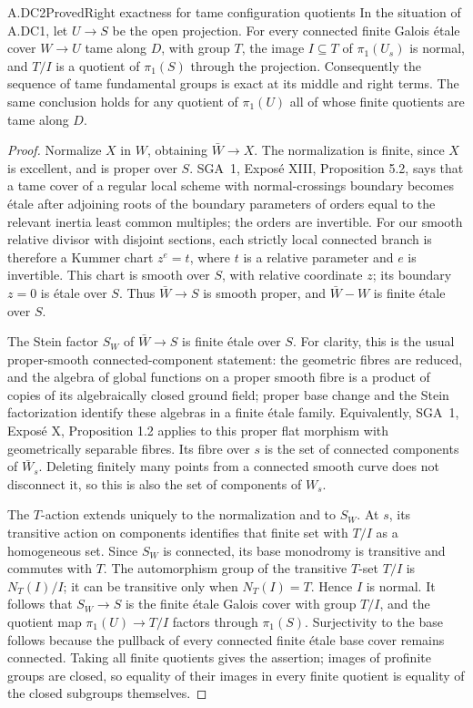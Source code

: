 \begin{claim}{A.DC2}{Proved}{Right exactness for tame configuration quotients}
In the situation of A.DC1, let $U\to S$ be the open projection.
For every connected finite Galois \'etale cover $W\to U$ tame along
$D$, with group $T$, the image $I\subseteq T$ of $\pi_1(U_s)$ is
normal, and $T/I$ is a quotient of $\pi_1(S)$ through the projection.
Consequently the sequence of tame fundamental groups is exact at its
middle and right terms. The same conclusion holds for any quotient of
$\pi_1(U)$ all of whose finite quotients are tame along $D$.
\end{claim}

\begin{proof}
Normalize $X$ in $W$, obtaining $\bar W\to X$. The normalization is
finite, since $X$ is excellent, and is proper over $S$.
SGA~1, Expos\'e XIII, Proposition 5.2, says that a tame cover of a
regular local scheme with normal-crossings boundary becomes \'etale
after adjoining roots of the boundary parameters of orders equal to
the relevant inertia least common multiples; the orders are invertible.
For our smooth relative divisor with disjoint sections, each strictly
local connected branch is therefore a Kummer chart $z^e=t$, where
$t$ is a relative parameter and $e$ is invertible. This chart is smooth
over $S$, with relative coordinate $z$; its boundary $z=0$ is \'etale
over $S$. Thus $\bar W\to S$ is smooth proper, and
$\bar W-W$ is finite \'etale over $S$.

The Stein factor $S_W$ of $\bar W\to S$ is finite \'etale over $S$.
For clarity, this is the usual proper-smooth connected-component
statement: the geometric fibres are reduced, and the algebra of
global functions on a proper smooth fibre is a product of copies of
its algebraically closed ground field; proper base change and the
Stein factorization identify these algebras in a finite \'etale family.
Equivalently, SGA~1, Expos\'e X, Proposition 1.2 applies to this proper
flat morphism with geometrically separable fibres.
Its fibre over $s$ is the set of connected components of $\bar W_s$.
Deleting finitely many points from a connected smooth curve does not
disconnect it, so this is also the set of components of $W_s$.

The $T$-action extends uniquely to the normalization and to $S_W$.
At $s$, its transitive action on components identifies that finite set
with $T/I$ as a homogeneous set. Since $S_W$ is connected, its base
monodromy is transitive and commutes with $T$. The automorphism group
of the transitive $T$-set $T/I$ is $N_T(I)/I$; it can be transitive
only when $N_T(I)=T$. Hence $I$ is normal. It follows that
$S_W\to S$ is the finite \'etale Galois cover with group $T/I$, and
the quotient map $\pi_1(U)\to T/I$ factors through $\pi_1(S)$.
Surjectivity to the base follows because the pullback of every
connected finite \'etale base cover remains connected. Taking all
finite quotients gives the assertion; images of profinite groups are
closed, so equality of their images in every finite quotient is
equality of the closed subgroups themselves.
\end{proof}

